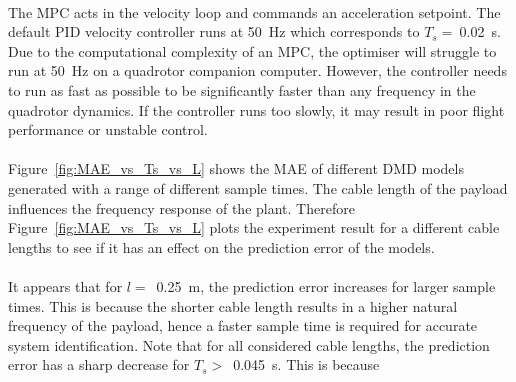         \paragraph{}
        The MPC acts in the velocity loop and commands an acceleration setpoint.
        The default PID velocity controller runs at \SI{50}{\hertz} which corresponds to $T_s =~$\SI{0.02}{\second}.
        Due to the computational complexity of an MPC, the optimiser will struggle to run at \SI{50}{\hertz} on a quadrotor companion computer.
        However, the controller needs to run as fast as possible 
        to be significantly faster than any frequency in the quadrotor dynamics.
        If the controller runs too slowly, it may result in poor flight performance or unstable control.

        

        \paragraph{}
        Figure~\ref{fig:MAE_vs_Ts_vs_L} shows the MAE of different DMD models 
        generated with a range of different sample times.
        The cable length of the payload influences the frequency response of the plant.
        Therefore Figure~\ref{fig:MAE_vs_Ts_vs_L} plots the experiment result 
        for a different cable lengths to see if it has an effect on the prediction error of the models.

        \paragraph{}
        It appears that for $l =$~\SI{0.25}{\metre}, the prediction error increases for larger sample times.
        This is because the shorter cable length results in a higher natural frequency of the payload,
        hence a faster sample time is required for accurate system identification.
        Note that for all considered cable lengths, the prediction error has a sharp decrease for 
        $T_s >$~\SI{0.045}{\second}.
        This is because

